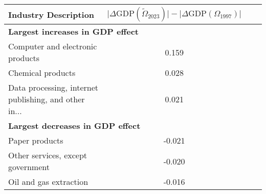 \begin{tabular}{lccc}
\toprule
Industry Description & $\lvert \Delta \text{GDP}(\tilde{\Omega}_{2023}) \rvert - \lvert \Delta \text{GDP}(\Omega_{1997}) \rvert$ \\
\midrule
\midrule
\multicolumn{2}{l}{\textbf{Largest increases in GDP effect}} \\
\midrule
Computer and electronic products & 0.159 \\
Chemical products & 0.028 \\
Data processing, internet publishing, and other in... & 0.021 \\
\midrule
\multicolumn{2}{l}{\textbf{Largest decreases in GDP effect}} \\
\midrule
Paper products & -0.021 \\
Other services, except government & -0.020 \\
Oil and gas extraction & -0.016 \\
\bottomrule
\end{tabular}